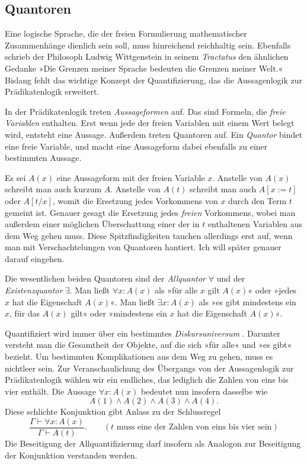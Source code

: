 \subsection{Quantoren}

Eine logische Sprache, die der freien Formulierung mathematischer
Zusammenhänge dienlich sein soll, muss hinreichend reichhaltig sein.
Ebenfalls schrieb der Philosoph Ludwig Wittgenstein in seinem
\emph{Tractatus} den ähnlichen Gedanke »Die Grenzen meiner Sprache
bedeuten die Grenzen meiner Welt.« Bislang fehlt das wichtige Konzept
der Quantifizierung, das die Aussagenlogik zur Prädikatenlogik
erweitert.

In der Prädikatenlogik treten \emph{Aussageformen}
auf. Das sind Formeln, die \emph{freie Variablen}
enthalten. Erst wenn jede der freien Variablen mit einem Wert belegt
wird, entsteht eine Aussage. Außerdem treten Quantoren auf. Ein
\emph{Quantor} bindet eine freie Variable, und macht
eine Aussageform dabei ebenfalls zu einer bestimmten Aussage.


Es sei $A(x)$ eine Aussageform mit der freien Variable $x$. Anstelle
von $A(x)$ schreibt man auch kurzum $A$. Anstelle von $A(t)$ schreibt
man auch $A[x:=t]$ oder $A[t/x]$, womit die Ersetzung jedes Vorkommens
von $x$ durch den Term $t$ gemeint ist. Genauer gesagt die Ersetzung
jedes \emph{freien} Vorkommens, wobei man außerdem einer möglichen
Überschattung einer der in $t$ enthaltenen Variablen aus dem Weg gehen
muss. Diese Spitzfindigkeiten tauchen allerdings erst auf, wenn man mit
Verschachtelungen von Quantoren hantiert. Ich will später
genauer darauf eingehen.

Die wesentlichen beiden Quantoren sind der \emph{Allquantor}%
 $\forall$ und der
\emph{Existenzquantor} $\exists$. Man ließt
$\forall x\colon A(x)$ als »für alle $x$ gilt $A(x)$« oder »jedes $x$
hat die Eigenschaft $A(x)$«. Man ließt $\exists x\colon A(x)$ als »es
gibt mindestens ein $x$, für das $A(x)$ gilt« oder »mindestens ein $x$
hat die Eigenschaft $A(x)$«.

Quantifiziert wird immer über ein bestimmtes \emph{Diskursuniversum}%
. Darunter versteht man die Gesamtheit der
Objekte, auf die sich »für alle« und »es gibt« bezieht. Um bestimmten
Komplikationen aus dem Weg zu gehen, muss es nichtleer sein. Zur
Veranschaulichung des Übergangs von der Aussagenlogik zur Prädikatenlogik
wählen wir ein endliches, das lediglich die Zahlen von eins bis vier
enthält. Die Aussage $\forall x\colon A(x)$ bedeutet nun insofern
dasselbe wie
\[A(1)\land A(2)\land A(3)\land A(4).\]
Diese schlichte Konjunktion gibt Anlass zu der Schlussregel
\[\dfrac{\Gamma\vdash\forall x\colon A(x)}{\Gamma\vdash A(t)}.
\qquad(\text{$t$ muss eine der Zahlen von eins bis vier sein})\]
Die Beseitigung der Allquantifizierung darf insofern als Analogon zur
Beseitigung der Konjunktion verstanden werden.

